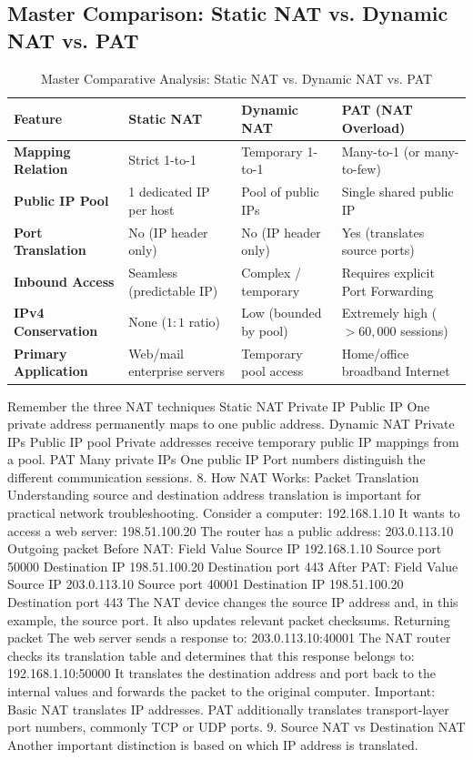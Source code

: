 \subsection{Master Comparison: Static NAT vs. Dynamic NAT vs. PAT}
\begin{table}[htbp]
\centering
\caption{Master Comparative Analysis: Static NAT vs. Dynamic NAT vs. PAT}
\label{tab:nat_master_comparison}
\begin{tabularx}{\textwidth}{p{3.2cm} X X X}
\toprule
\textbf{Feature} & \textbf{Static NAT} & \textbf{Dynamic NAT} & \textbf{PAT (NAT Overload)} \\
\midrule
\textbf{Mapping Relation} & Strict 1-to-1 & Temporary 1-to-1 & Many-to-1 (or many-to-few) \\
\textbf{Public IP Pool} & 1 dedicated IP per host & Pool of public IPs & Single shared public IP \\
\textbf{Port Translation} & No (IP header only) & No (IP header only) & Yes (translates source ports) \\
\textbf{Inbound Access} & Seamless (predictable IP) & Complex / temporary & Requires explicit Port Forwarding \\
\textbf{IPv4 Conservation} & None ($1:1$ ratio) & Low (bounded by pool) & Extremely high ($>60,000$ sessions) \\
\textbf{Primary Application} & Web/mail enterprise servers & Temporary pool access & Home/office broadband Internet \\
\bottomrule
\end{tabularx}
\end{table}
Remember the three NAT techniques
Static NAT
Private IP
Public IP
One private address permanently maps to one public address.
Dynamic NAT
Private IPs
Public IP pool
Private addresses receive temporary public IP mappings from a pool.
PAT
Many private IPs
One public IP
Port numbers distinguish the different communication sessions.
8. How NAT Works: Packet Translation
Understanding source and destination address translation is important for practical network troubleshooting.
Consider a computer:
192.168.1.10
It wants to access a web server:
198.51.100.20
The router has a public address:
203.0.113.10
Outgoing packet
Before NAT:
Field
Value
Source IP
192.168.1.10
Source port
50000
Destination IP
198.51.100.20
Destination port
443
After PAT:
Field
Value
Source IP
203.0.113.10
Source port
40001
Destination IP
198.51.100.20
Destination port
443
The NAT device changes the source IP address and, in this example, the source port.
It also updates relevant packet checksums.
Returning packet
The web server sends a response to:
203.0.113.10:40001
The NAT router checks its translation table and determines that this response belongs to:
192.168.1.10:50000
It translates the destination address and port back to the internal values and forwards the packet to the original computer.
Important: Basic NAT translates IP addresses. PAT additionally translates transport-layer port numbers, commonly TCP or UDP ports.
9. Source NAT vs Destination NAT
Another important distinction is based on which IP address is translated.
